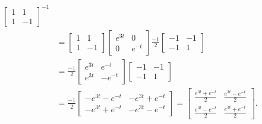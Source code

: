 \documentclass{ximera}
\begin{document}
\begin{example}
\begin{equation*}
\begin{split}
\begin{bmatrix}
                1 & 1 \\
                1 & -1
            \end{bmatrix}^{-1}
            \\
            & =
            \begin{bmatrix}
                1 & 1 \\
                1 & -1
            \end{bmatrix}
            \begin{bmatrix}
                e^{3t} & 0 \\
                0 & e^{-t}
            \end{bmatrix}
            \frac{-1}{2}
            \begin{bmatrix}
                -1 & -1 \\
                -1 & 1
            \end{bmatrix}
            \\
            & = \frac{-1}{2}
            \begin{bmatrix}
                e^{3t} & e^{-t} \\
                e^{3t} & -e^{-t}
            \end{bmatrix}
            \begin{bmatrix}
                -1 & -1 \\
                -1 & 1
            \end{bmatrix}
            \\
            & = \frac{-1}{2}
            \begin{bmatrix}
                -e^{3t}-e^{-t} & -e^{3t}+e^{-t} \\
                -e^{3t}+e^{-t} & -e^{3t}-e^{-t}
            \end{bmatrix}
             =
            \begin{bmatrix}
                \frac{e^{3t}+e^{-t}}{2} & \frac{e^{3t}-e^{-t}}{2} \\
                \frac{e^{3t}-e^{-t}}{2} & \frac{e^{3t}+e^{-t}}{2}
            \end{bmatrix} .
        \end{split}
    \end{equation*}
    

\end{example}
\end{document}
